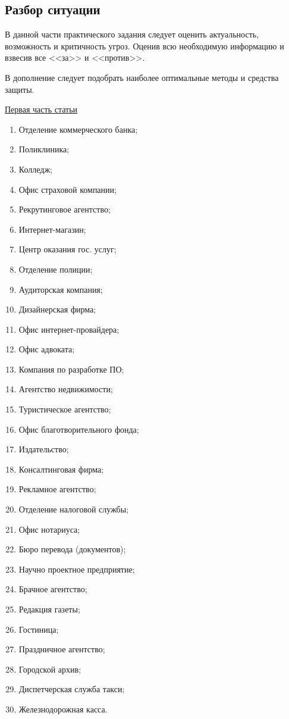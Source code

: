 \subsection{Разбор ситуации}
В данной части практического задания следует оценить актуальность,
возможность и критичность угроз. Оценив всю необходимую информацию и взвесив
все <<за>> и <<против>>.

В дополнение следует подобрать наиболее оптимальные методы и средства защиты.

\href{https://habrahabr.ru/company/vps_house/blog/343110/}{Первая часть
      статьи}

\label{var_PR1}
\begin{minipage}{0.45\textwidth}
  \begin{enumerate}
    \item Отделение коммерческого банка;
    \item Поликлиника;
    \item Колледж;
    \item Офис страховой компании;
    \item Рекрутинговое агентство;
    \item Интернет-магазин;
    \item Центр оказания гос. услуг;
    \item Отделение полиции;
    \item Аудиторская компания;
    \item Дизайнерская фирма;
    \item Офис интернет-провайдера;
    \item Офис адвоката;
    \item Компания по разработке ПО;
    \item Агентство недвижимости;
    \item Туристическое агентство;
  \end{enumerate}
\end{minipage}
\hfill
\begin{minipage}{0.45\textwidth}
  \begin{enumerate}
    \setcounter{enumi}{15}
    \item Офис благотворительного фонда;
    \item Издательство;
    \item Консалтинговая фирма;
    \item Рекламное агентство;
    \item Отделение налоговой службы;
    \item Офис нотариуса;
    \item Бюро перевода (документов);
    \item Научно проектное предприятие;
    \item Брачное агентство;
    \item Редакция газеты;
    \item Гостиница;
    \item Праздничное агентство;
    \item Городской архив;
    \item Диспетчерская служба такси;
    \item Железнодорожная касса.
  \end{enumerate}
\end{minipage}

